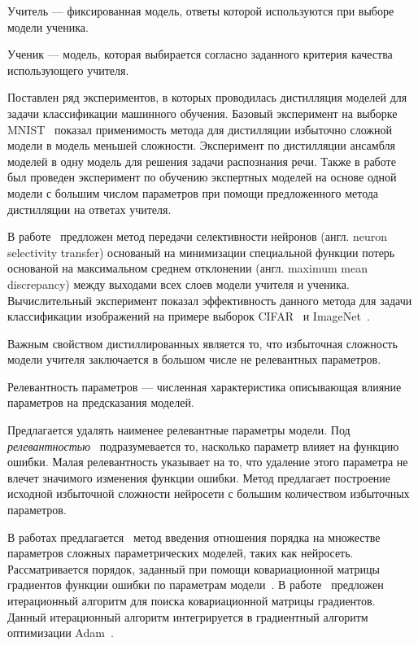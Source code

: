 \begin{definition}
Учитель --- фиксированная модель, ответы которой используются при выборе модели ученика.
\end{definition}

\begin{definition}
Ученик --- модель, которая выбирается согласно заданного критерия качества использующего учителя.
\end{definition}



Поставлен ряд экспериментов, в которых проводилась дистилляция моделей для задачи классификации машинного обучения.
Базовый эксперимент на выборке MNIST~\cite{mnist} показал применимость метода для дистилляции избыточно сложной модели в модель меньшей сложности.
Эксперимент по дистилляции ансамбля моделей в одну модель для решения задачи распознания речи. Также в работе~\cite{Hinton2015} был проведен эксперимент по обучению экспертных моделей на основе одной модели с большим числом параметров при помощи предложенного метода дистилляции на ответах учителя.

В работе~\cite{Zehao2017} предложен метод передачи селективности нейронов (англ. neuron selectivity transfer) основаный на минимизации специальной функции потерь основаной на максимальном среднем отклонении (англ. maximum mean discrepancy) между выходами всех слоев модели учителя и ученика. Вычислительный эксперимент показал эффективность данного метода для задачи классификации изображений на примере выборок CIFAR~\cite{cifar10} и ImageNet~\cite{imagenet}.

Важным свойством дистиллированных является то, что избыточная сложность модели учителя заключается в большом числе не релевантных параметров.
\begin{definition}
Релевантность параметров --- численная характеристика описывающая влияние параметров на предсказания моделей.
\end{definition}
Предлагается удалять наименее релевантные параметры модели. Под \textit{релевантностью}~\cite{cun1990} подразумевается то, насколько параметр влияет на функцию ошибки. Малая релевантность указывает на то, что удаление этого параметра не влечет значимого изменения функции ошибки. Метод предлагает построение исходной избыточной сложности нейросети с большим количеством избыточных параметров.

В работах предлагается~\cite{cun1990,graves2011} метод введения отношения порядка на множестве параметров сложных параметрических моделей, таких как нейросеть. Рассматривается порядок, заданный при помощи ковариационной матрицы градиентов функции ошибки по параметрам модели~\cite{Mandt2017}. В работе~\cite{Chunyan2016} предложен итерационный алгоритм для поиска ковариационной матрицы градиентов. Данный итерационный алгоритм интегрируется в градиентный алгоритм оптимизации Adam~\cite{kingma2014}.

